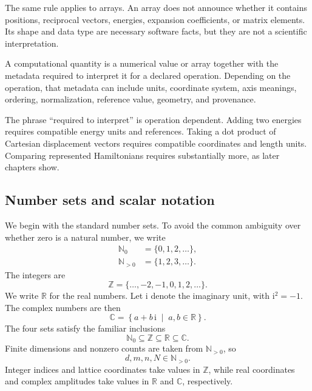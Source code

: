 The same rule applies to arrays. An array does not announce whether it contains
positions, reciprocal vectors, energies, expansion coefficients, or matrix
elements. Its shape and data type are necessary software facts, but they are not
a scientific interpretation.

\begin{definition}
A computational quantity is a numerical value or array together with the
metadata required to interpret it for a declared operation. Depending on the
operation, that metadata can include units, coordinate system, axis meanings,
ordering, normalization, reference value, geometry, and provenance.
\end{definition}

The phrase ``required to interpret'' is operation dependent. Adding two
energies requires compatible energy units and references. Taking a dot product
of Cartesian displacement vectors requires compatible coordinates and length
units. Comparing represented Hamiltonians requires substantially more, as later
chapters show.


\subsection{Number sets and scalar notation}

We begin with the standard number sets. To avoid the common ambiguity over
whether zero is a natural number, we write
\begin{subequations}
\label{eq:training-natural-number-conventions}
\begin{align}
  \mathbb N_0
  &=\{0,1,2,\ldots\},
  \label{eq:training-natural-numbers-with-zero}\\
  \mathbb N_{>0}
  &=\{1,2,3,\ldots\}.
  \label{eq:training-positive-natural-numbers}
\end{align}
\end{subequations}
The integers are
\begin{equation}
  \mathbb Z=\{\ldots,-2,-1,0,1,2,\ldots\}.
\end{equation}
We write \(\mathbb R\) for the real numbers. Let \(\mathrm i\) denote the
imaginary unit, with \(\mathrm i^2=-1\). The complex numbers are then
\begin{equation}
  \mathbb C
  =\left\{a+b\,\mathrm i\;\middle|\;a,b\in\mathbb R\right\}.
  \label{eq:training-standard-number-sets}
\end{equation}
The four sets satisfy the familiar inclusions
\begin{equation}
  \mathbb N_0\subseteq\mathbb Z\subseteq\mathbb R\subseteq\mathbb C.
\end{equation}
Finite dimensions and nonzero counts are taken from \(\mathbb N_{>0}\), so
\begin{equation}
  d,m,n,N\in\mathbb N_{>0}.
\end{equation}
Integer indices and lattice coordinates take values in \(\mathbb Z\), while
real coordinates and complex amplitudes take values in \(\mathbb R\) and
\(\mathbb C\), respectively.

